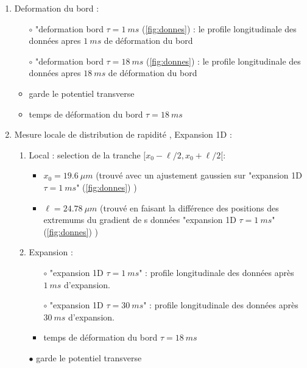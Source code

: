 \documentclass[a3, 10pt,twoside]{article}          %
\theoremstyle{plain}
\theoremstyle{definition}
\theoremstyle{remark}
\theoremstyle{definition} %
\begin{document}
\begin{minipage}[b]{0.45\textwidth}
\begin{enumerate}[label =\Alph*)]
			 
		\item Deformation du bord : 
			\begin{itemize}[label =$\bullet$]
				\item[$\circ$] "deformation bord $\tau = 1~ ms$ (\ref{fig:donnes}) : le profile longitudinale des données apres $1~ms$ de déformation du bord
				\item[$\circ$] "deformation bord $\tau = 18~ ms$ (\ref{fig:donnes}) : le profile longitudinale des données apres $18~ms$ de déformation du bord
				\item garde le potentiel transverse %
				\item temps de déformation du bord $\tau = 18~ ms$	
			\end{itemize}
		\item Mesure locale de distribution de rapidité , Expansion 1D   : 
			\begin{enumerate}[label =\alph*)]
				\item Local : selection de la tranche $[ x_0 - \ell/2 , x_0 + \ell/2 [$:
					\begin{itemize}[label =$\bullet$]
						\item $x_0 = 19.6 ~\mu m $ (trouvé avec un ajustement gaussien sur "expansion 1D $\tau =1~ms$" (\ref{fig:donnes}) ) 
						\item $\ell = 24.78 ~ \mu m $ (trouvé en faisant la différence des positions des extremums du gradient de s données "expansion 1D $\tau =1~ms$" (\ref{fig:donnes}) ) 	
					\end{itemize}
				\item Expansion :
					\begin{itemize}[label =$\bullet$]
						\item[$\circ$] "expansion 1D $\tau =1~ms$" : profile longitudinale des données après $1~ms$ d'expansion.
						\item[$\circ$] "expansion 1D $\tau =30~ms$" : profile longitudinale des données après $30~ms$ d'expansion.
						\item temps de déformation du bord $\tau = 18~ ms$		
					\end{itemize}
				\item[$\bullet$] garde le potentiel transverse %


			\end{enumerate}
			

	\end{enumerate}
	
	\end{minipage}
	
\end{document}
